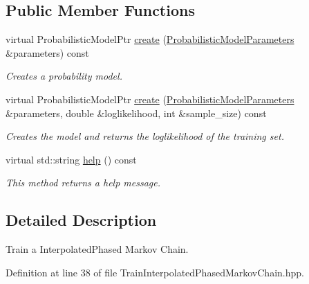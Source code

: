 \subsection*{Public Member Functions}
\begin{DoxyCompactItemize}
\item 
virtual Probabilistic\+Model\+Ptr \hyperlink{classtops_1_1TrainInterpolatedPhasedMarkovChain_a218b211bb755e02ffd30e8420d52d949}{create} (\hyperlink{classtops_1_1ProbabilisticModelParameters}{Probabilistic\+Model\+Parameters} \&parameters) const
\begin{DoxyCompactList}\small\item\em Creates a probability model. \end{DoxyCompactList}\item 
\mbox{\label{classtops_1_1TrainInterpolatedPhasedMarkovChain_a57c371713cb3c38d34ce8ce8bc1f714f}} 
virtual Probabilistic\+Model\+Ptr \hyperlink{classtops_1_1TrainInterpolatedPhasedMarkovChain_a57c371713cb3c38d34ce8ce8bc1f714f}{create} (\hyperlink{classtops_1_1ProbabilisticModelParameters}{Probabilistic\+Model\+Parameters} \&parameters, double \&loglikelihood, int \&sample\+\_\+size) const
\begin{DoxyCompactList}\small\item\em Creates the model and returns the loglikelihood of the training set. \end{DoxyCompactList}\item 
\mbox{\label{classtops_1_1TrainInterpolatedPhasedMarkovChain_af8b99f337038d50b057112e339a58d81}} 
virtual std\+::string \hyperlink{classtops_1_1TrainInterpolatedPhasedMarkovChain_af8b99f337038d50b057112e339a58d81}{help} () const
\begin{DoxyCompactList}\small\item\em This method returns a help message. \end{DoxyCompactList}\end{DoxyCompactItemize}


\subsection{Detailed Description}
Train a Interpolated\+Phased Markov Chain. 

Definition at line 38 of file Train\+Interpolated\+Phased\+Markov\+Chain.\+hpp.



